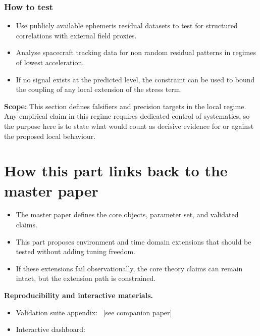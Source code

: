 \documentclass[11pt,a4paper]{article}
\begin{document}
\subsubsection{How to test}
\begin{itemize}
  \item Use publicly available ephemeris residual datasets to test for structured correlations with external field proxies.
  \item Analyse spacecraft tracking data for non random residual patterns in regimes of lowest acceleration.
  \item If no signal exists at the predicted level, the constraint can be used to bound the coupling of any local extension of the stress term.
\end{itemize}

\begin{mdframed}[linecolor=accent,linewidth=0.5pt,backgroundcolor=callout-bg,leftline=true,rightline=true,topline=true,bottomline=true,innerleftmargin=8pt,innerrightmargin=8pt,innertopmargin=6pt,innerbottommargin=6pt]
\textbf{Scope:} This section defines falsifiers and precision targets in the local regime. Any empirical claim in this regime requires dedicated control of systematics, so the purpose here is to state what would count as decisive evidence for or against the proposed local behaviour.
\end{mdframed}

\section{How this part links back to the master paper}
\label{sec:links}
\begin{itemize}
  \item The master paper defines the core objects, parameter set, and validated claims.
  \item This part proposes environment and time domain extensions that should be tested without adding tuning freedom.
  \item If these extensions fail observationally, the core theory claims can remain intact, but the extension path is constrained.
\end{itemize}

\begin{mdframed}[linecolor=accent,linewidth=0.5pt,backgroundcolor=callout-bg,leftline=true,rightline=true,topline=true,bottomline=true,innerleftmargin=8pt,innerrightmargin=8pt,innertopmargin=6pt,innerbottommargin=6pt]
\textbf{Reproducibility and interactive materials.}\begin{itemize}
  \item Validation suite appendix: \textit{{\small\protect{}}}~[see companion paper]
  \item Interactive dashboard: {\small\protect{}}
\end{itemize}
\end{mdframed}
\end{document}
